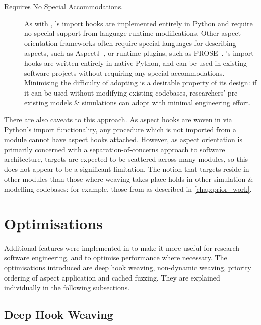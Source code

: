 \begin{description}
    \item[Requires No Special Accommodations.] As with \pydysofu{},
        \pdsfthree{}'s import hooks are implemented entirely in Python and
        require no special support from language runtime modifications. Other
        aspect orientation frameworks often require special languages for
        describing aspects, such as AspectJ~\cite{AspectJLanguageAndTools}, or
        runtime plugins, such as PROSE~\cite{popovici2002PROSE}. \pdsfthree{}'s
        import hooks are written entirely in native Python, and can be used in
        existing software projects without requiring any special accommodations.
        Minimising the difficulty of adopting \pdsfthree{} is a desirable property of
        its design: if it can be used without modifying existing codebases,
        researchers' pre-existing models \& simulations can adopt \pdsfthree{} with
        minimal engineering effort.
\end{description}

There are also caveats to this approach. As aspect hooks are woven in
\pdsfthree{} via Python's import functionality, any procedure which is not
imported from a module cannot have aspect hooks attached.  However, as aspect orientation is primarily
concerned with a separation-of-concerns approach to software architecture,
targets are expected to be scattered across many modules, so this does not
appear to be a significant limitation. The notion that targets reside in other
modules than those where weaving takes place holds in other \aspectoriented{}
simulation \& modelling codebases: for example, those from
\citet{wallis2018caise} as described in \cref{chap:prior_work}.



\section{Optimisations}
\label{pdsf3_optimisations}

Additional features were implemented in \pdsfthree to make it more useful for
research software engineering, and to optimise performance where necessary. The
optimisations introduced are deep hook weaving, non-dynamic weaving, priority
ordering of aspect application and cached fuzzing. They are explained
individually in the following subsections.

\subsection{Deep Hook Weaving}\label{deep_hook_weaving}

